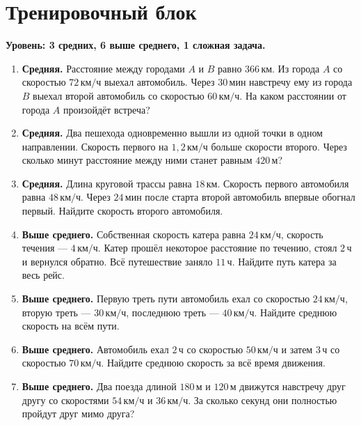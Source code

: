 \documentclass[a4paper,12pt]{article}
\newcommand{\unit}[1]{\,\text{#1}}
\begin{document}
\clearpage
\section*{Тренировочный блок}

\textbf{Уровень: 3 средних, 6 выше среднего, 1 сложная задача.}

\begin{enumerate}
  \item \textbf{Средняя.}
  Расстояние между городами $A$ и $B$ равно $366\unit{км}$.
  Из города $A$ со скоростью $72\unit{км/ч}$ выехал автомобиль.
  Через $30\unit{мин}$ навстречу ему из города $B$ выехал второй
  автомобиль со скоростью $60\unit{км/ч}$.
  На каком расстоянии от города $A$ произойдёт встреча?

  \item \textbf{Средняя.}
  Два пешехода одновременно вышли из одной точки в одном направлении.
  Скорость первого на $1{,}2\unit{км/ч}$ больше скорости второго.
  Через сколько минут расстояние между ними станет равным $420\unit{м}$?

  \item \textbf{Средняя.}
  Длина круговой трассы равна $18\unit{км}$.
  Скорость первого автомобиля равна $48\unit{км/ч}$.
  Через $24\unit{мин}$ после старта второй автомобиль впервые
  обогнал первый.
  Найдите скорость второго автомобиля.

  \item \textbf{Выше среднего.}
  Собственная скорость катера равна $24\unit{км/ч}$,
  скорость течения --- $4\unit{км/ч}$.
  Катер прошёл некоторое расстояние по течению,
  стоял $2\unit{ч}$ и вернулся обратно.
  Всё путешествие заняло $11\unit{ч}$.
  Найдите путь катера за весь рейс.

  \item \textbf{Выше среднего.}
  Первую треть пути автомобиль ехал со скоростью $24\unit{км/ч}$,
  вторую треть --- $30\unit{км/ч}$,
  последнюю треть --- $40\unit{км/ч}$.
  Найдите среднюю скорость на всём пути.

  \item \textbf{Выше среднего.}
  Автомобиль ехал $2\unit{ч}$ со скоростью $50\unit{км/ч}$
  и затем $3\unit{ч}$ со скоростью $70\unit{км/ч}$.
  Найдите среднюю скорость за всё время движения.

  \item \textbf{Выше среднего.}
  Два поезда длиной $180\unit{м}$ и $120\unit{м}$
  движутся навстречу друг другу со скоростями
  $54\unit{км/ч}$ и $36\unit{км/ч}$.
  За сколько секунд они полностью пройдут друг мимо друга?


\end{enumerate}
\end{document}
